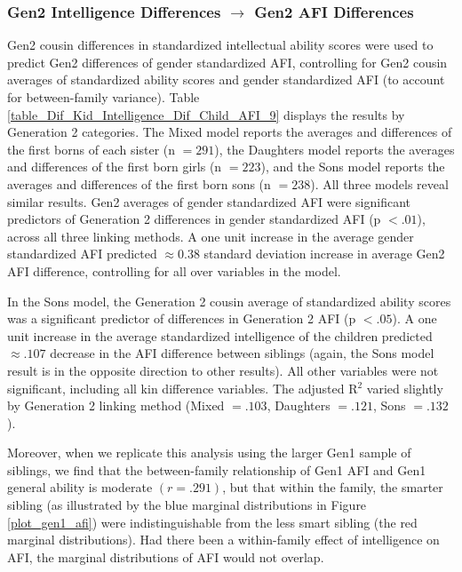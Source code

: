 \subsubsection{Gen2 Intelligence Differences $\rightarrow$ Gen2 AFI Differences}
Gen2 cousin differences in standardized intellectual ability scores were used to predict Gen2 differences of gender standardized AFI, controlling for Gen2 cousin averages of standardized ability scores and gender standardized AFI (to account for between-family variance). Table \ref{table_Dif_Kid_Intelligence_Dif_Child_AFI_9} displays the results by Generation 2 categories. The Mixed model reports the averages and differences of the first borns of each sister (n $= 291$), the Daughters model reports the averages and differences of the first born girls (n $= 223$), and the Sons model reports the averages and differences of the first born sons (n $= 238$). All three models reveal similar results. Gen2 averages of gender standardized AFI were significant predictors of Generation 2 differences in gender standardized AFI (p $< .01$), across all three linking methods. A one unit increase in the average gender standardized AFI predicted $\approx 0.38$ standard deviation increase in average Gen2 AFI difference, controlling for all over variables in the model. 

In the Sons model, the Generation 2 cousin average of standardized ability scores was a significant predictor of differences in Generation 2 AFI (p $< .05$). A one unit increase in the average standardized intelligence of the children predicted $\approx .107$ decrease in the AFI difference between siblings (again, the Sons model result is in the opposite direction to other results). All other variables were not significant, including all kin difference variables. The adjusted R$^{2}$ varied slightly by Generation 2 linking method (Mixed $= .103$, Daughters $= .121$, Sons $= .132$).

Moreover, when we replicate this analysis using the larger Gen1 sample of siblings, we find that the between-family relationship of Gen1 AFI and Gen1 general ability is moderate $(r =.291)$, but that within the family, the smarter sibling (as illustrated by the blue marginal distributions in Figure \ref{plot_gen1_afi}) were indistinguishable from the less smart sibling (the red marginal distributions). Had there been a within-family effect of intelligence on AFI, the marginal distributions of AFI would not overlap.\pagebreak

